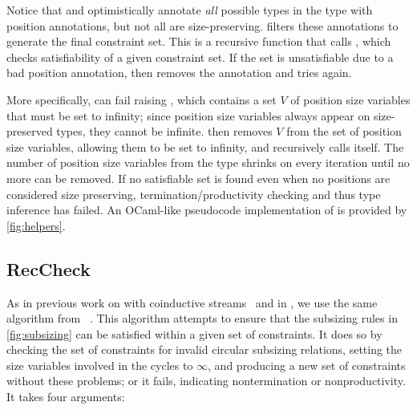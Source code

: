 

Notice that \setrecstars and \setcorecstars optimistically annotate \textit{all} possible \coinductive types in the \cofixpoint type with position annotations, but not all \cofixpoints are size-preserving.
\RecCheckLoop filters these annotations to generate the final constraint set.
This is a recursive function that calls \RecCheck, which checks satisfiability of a given constraint set.
If the set is unsatisfiable due to a bad position annotation, then \RecCheckLoop removes the annotation and tries again.

More specifically, \RecCheck can fail raising \RecCheckFail, which contains a set $V$ of position size variables that must be set to infinity; since position size variables always appear on size-preserved types, they cannot be infinite.
\RecCheckLoop then removes $V$ from the set of position size variables, allowing them to be set to infinity, and recursively calls itself.
The number of position size variables from the \cofixpoint type shrinks on every iteration until no more can be removed.
If no satisfiable set is found even when no positions are considered size preserving, termination/productivity checking and thus type inference has failed.
An OCaml-like pseudocode implementation of \RecCheckLoop is provided by \autoref{fig:helpers}.

\subsection{RecCheck}\label{subsec:algorithm:reccheck}

As in previous work on \CChatomega with coinductive streams~\citep{cc-hat-omega} and in \CIChat, we use the same \RecCheck algorithm from \Fhat~\citep{f-hat}.
This algorithm attempts to ensure that the subsizing rules in \autoref{fig:subsizing} can be satisfied within a given set of constraints.
It does so by checking the set of constraints for invalid circular subsizing relations, setting the size variables involved in the cycles to $\infty$, and producing a new set of constraints without these problems; or it fails, indicating nontermination or nonproductivity.
It takes four arguments:

